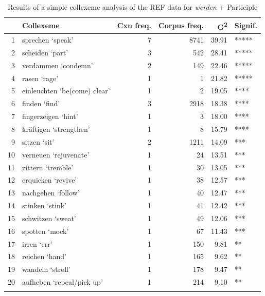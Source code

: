 \documentclass[output=paper,colorlinks,citecolor=brown]{langscibook}
\begin{document}
\begin{table}[ht]
\centering
\begin{tabular}{rlrrrl}
  \lsptoprule
 & Collexeme & Cxn freq. & Corpus freq. & G\textsuperscript{2} & Signif. \\ 
  \midrule
1 & sprechen `speak'&   7 & 8741 & 39.91 & ***** \\ 
  2 & scheiden `part'&   3 & 542 & 28.41 & ***** \\ 
  3 & verdammen `condemn'&   2 & 149 & 22.46 & ***** \\ 
  4 & rasen `rage'&   1 &   1 & 21.82 & ***** \\ 
  5 & einleuchten `be(come) clear'  &   1 &   2 & 19.05 & **** \\ 
  6 & finden `find' &   3 & 2918 & 18.38 & **** \\ 
  7 & fingerzeigen `hint'&   1 &   3 & 18.00 & **** \\ 
  8 & kräftigen `strengthen'&   1 &   8 & 15.79 & **** \\ 
  9 & sitzen `sit'&   2 & 1211 & 14.09 & *** \\ 
  10 & verneuen `rejuvenate'&   1 &  24 & 13.51 & *** \\ 
  11 & zittern `tremble'&   1 &  30 & 13.05 & *** \\ 
  12 & erquicken `revive'&   1 &  38 & 12.57 & *** \\ 
  13 & nachgehen `follow'&   1 &  40 & 12.47 & *** \\ 
  14 & stinken `stink'&   1 &  41 & 12.42 & *** \\ 
  15 & schwitzen `sweat'&   1 &  49 & 12.06 & *** \\ 
  16 & spotten `mock'&   1 &  67 & 11.43 & *** \\ 
  17 & irren `err'&   1 & 150 & 9.81 & ** \\ 
  18 & reichen `hand'&   1 & 165 & 9.62 & ** \\ 
  19 & wandeln `stroll'&   1 & 178 & 9.47 & ** \\ 
  20 & aufheben `repeal/pick up'  &   1 & 214 & 9.10 & ** \\
   \lspbottomrule
\end{tabular}
\caption{Results of a simple collexeme analysis of the REF data for \textit{werden} + Participle} 
\label{simple_collex_werden_part_ref}
\end{table}
\end{document}
